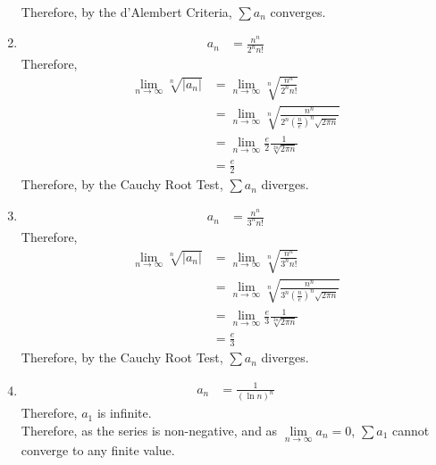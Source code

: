 \documentclass[fleqn, a4paper, 12pt, oneside]{amsart}
\theoremstyle{definition}
\theoremstyle{theorem}
\begin{document}
\begin{solution}
\begin{enumerate}[label=(\alph*), leftmargin=*]
\begin{align*}
			\end{align*}
			Therefore, by the d'Alembert Criteria, $\sum a_n$ converges.
		\item
			\begin{align*}
				a_n & = \frac{n^n}{2^n n!}
			\end{align*}
			Therefore,
			\begin{align*}
				\lim\limits_{n \to \infty} \sqrt[n]{|a_n|} & = \lim\limits_{n \to \infty} \sqrt[n]{\frac{n^n}{2^n n!}}                                          \\
                                                                           & = \lim\limits_{n \to \infty} \sqrt[n]{\frac{n^n}{2^n \left( \frac{n}{e} \right)^n \sqrt{2 \pi n}}} \\
                                                                           & = \lim\limits_{n \to \infty} \frac{e}{2} \frac{1}{\sqrt[2 n]{2 \pi n}}                             \\
                                                                           & = \frac{e}{2}
			\end{align*}
			Therefore, by the Cauchy Root Test, $\sum a_n$ diverges.
		\item
			\begin{align*}
				a_n & = \frac{n^n}{3^n n!}
			\end{align*}
			Therefore,
			\begin{align*}
				\lim\limits_{n \to \infty} \sqrt[n]{|a_n|} & = \lim\limits_{n \to \infty} \sqrt[n]{\frac{n^n}{3^n n!}}                                          \\
                                                                           & = \lim\limits_{n \to \infty} \sqrt[n]{\frac{n^n}{3^n \left( \frac{n}{e} \right)^n \sqrt{2 \pi n}}} \\
                                                                           & = \lim\limits_{n \to \infty} \frac{e}{3} \frac{1}{\sqrt[2 n]{2 \pi n}}                             \\
                                                                           & = \frac{e}{3}
			\end{align*}
			Therefore, by the Cauchy Root Test, $\sum a_n$ diverges.
		\item
			\begin{align*}
				a_n & = \frac{1}{(\ln n)^n}
			\end{align*}
			Therefore, $a_1$ is infinite.\\
			Therefore, as the series is non-negative, and as $\lim\limits_{n \to \infty} a_n = 0$, $\sum a_1$ cannot converge to any finite value.\\

\end{enumerate}
\end{solution}
\end{document}

